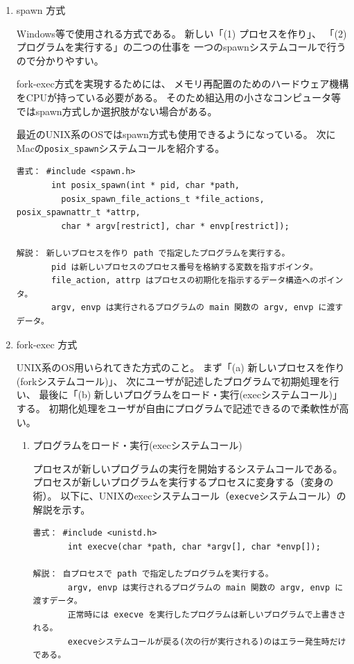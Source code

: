 \documentclass[a4j,dvipdfmx]{jarticle}
\begin{document}
\begin{enumerate}

\item spawn 方式

Windows等で使用される方式である。
新しい「(1) プロセスを作り」、
「(2) プログラムを実行する」の二つの仕事を
一つのspawnシステムコールで行うので分かりやすい。

fork-exec方式を実現するためには、
メモリ再配置のためのハードウェア機構をCPUが持っている必要がある。
そのため組込用の小さなコンピュータ等ではspawn方式しか選択肢がない場合がある。

最近のUNIX系のOSではspawn方式も使用できるようになっている。
次にMacの\verb/posix_spawn/システムコールを紹介する。

\begin{lstlisting}[numbers=none]
書式： #include <spawn.h>
       int posix_spawn(int * pid, char *path,
         posix_spawn_file_actions_t *file_actions,  posix_spawnattr_t *attrp,
         char * argv[restrict], char * envp[restrict]);

解説： 新しいプロセスを作り path で指定したプログラムを実行する。
       pid は新しいプロセスのプロセス番号を格納する変数を指すポインタ。
       file_action, attrp はプロセスの初期化を指示するデータ構造へのポインタ。
       argv, envp は実行されるプログラムの main 関数の argv, envp に渡すデータ。
\end{lstlisting}


\item fork-exec 方式

UNIX系のOS用いられてきた方式のこと。
まず「(a) 新しいプロセスを作り(forkシステムコール)」、
次にユーザが記述したプログラムで初期処理を行い、
最後に「(b) 新しいプログラムをロード・実行(execシステムコール)」する。
初期化処理をユーザが自由にプログラムで記述できるので柔軟性が高い。

\begin{enumerate}
\item プログラムをロード・実行(execシステムコール)

プロセスが新しいプログラムの実行を開始するシステムコールである。
プロセスが新しいプログラムを実行するプロセスに変身する（変身の術）。
以下に、UNIXのexecシステムコール（\verb/execve/システムコール）の解説を示す。

\begin{lstlisting}[numbers=none]
書式： #include <unistd.h>
       int execve(char *path, char *argv[], char *envp[]);

解説： 自プロセスで path で指定したプログラムを実行する。
       argv, envp は実行されるプログラムの main 関数の argv, envp に渡すデータ。
       正常時には execve を実行したプログラムは新しいプログラムで上書きされる。
       execveシステムコールが戻る(次の行が実行される)のはエラー発生時だけである。
\end{lstlisting}



\end{enumerate}
\end{enumerate}
\end{document}
